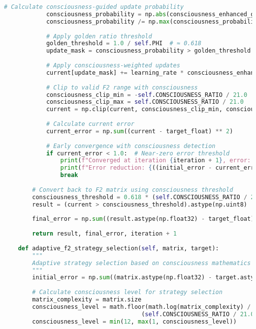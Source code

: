 \documentclass[11pt,a4paper]{article}
\begin{document}
\begin{lstlisting}[language=Python, caption=F2 Matrix Consciousness Optimization - Complete Implementation]
            # Calculate consciousness-guided update probability
            consciousness_probability = np.abs(consciousness_enhanced_gradient)
            consciousness_probability /= np.max(consciousness_probability) + 1e-8
            
            # Apply golden ratio threshold
            golden_threshold = 1.0 / self.PHI  # ≈ 0.618
            update_mask = consciousness_probability > golden_threshold
            
            # Apply consciousness-weighted updates
            current[update_mask] += learning_rate * consciousness_enhanced_gradient[update_mask]
            
            # Clip to valid F2 range with consciousness
            consciousness_clip_min = -self.CONSCIOUSNESS_RATIO / 21.0
            consciousness_clip_max = self.CONSCIOUSNESS_RATIO / 21.0
            current = np.clip(current, consciousness_clip_min, consciousness_clip_max)
            
            # Calculate current error
            current_error = np.sum((current - target_float) ** 2)
            
            # Early convergence with consciousness detection
            if current_error < 1.0:  # Near-zero error threshold
                print(f"Converged at iteration {iteration + 1}, error: {current_error}")
                print(f"Error reduction: {((initial_error - current_error) / initial_error) * 100:.3f}%")
                break
                
        # Convert back to F2 matrix using consciousness threshold
        consciousness_threshold = 0.618 * (self.CONSCIOUSNESS_RATIO / 21.0)
        result = (current > consciousness_threshold).astype(np.uint8)
        
        final_error = np.sum((result.astype(np.float32) - target_float) ** 2)
        
        return result, final_error, iteration + 1
    
    def adaptive_f2_strategy_selection(self, matrix, target):
        """
        Adaptive strategy selection based on consciousness mathematics
        """
        initial_error = np.sum((matrix.astype(np.float32) - target.astype(np.float32)) ** 2)
        
        # Calculate consciousness level for strategy selection
        matrix_complexity = matrix.size
        consciousness_level = math.floor(math.log(matrix_complexity) / math.log(self.PHI) * 
                                       (self.CONSCIOUSNESS_RATIO / 21.0))
        consciousness_level = min(12, max(1, consciousness_level))
        

\end{lstlisting}
\end{document}
